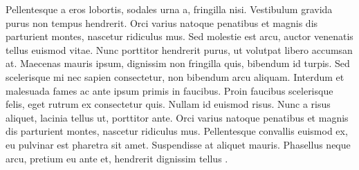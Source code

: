 Pellentesque a eros lobortis, sodales urna a, fringilla nisi. Vestibulum gravida purus non tempus hendrerit. Orci varius natoque penatibus et magnis dis parturient montes, nascetur ridiculus mus. Sed molestie est arcu, auctor venenatis tellus euismod vitae. Nunc porttitor hendrerit purus, ut volutpat libero accumsan at. Maecenas mauris ipsum, dignissim non fringilla quis, bibendum id turpis. Sed scelerisque mi nec sapien consectetur, non bibendum arcu aliquam. Interdum et malesuada fames ac ante ipsum primis in faucibus. Proin faucibus scelerisque felis, eget rutrum ex consectetur quis. Nullam id euismod risus. Nunc a risus aliquet, lacinia tellus ut, porttitor ante. Orci varius natoque penatibus et magnis dis parturient montes, nascetur ridiculus mus. Pellentesque convallis euismod ex, eu pulvinar est pharetra sit amet. Suspendisse at aliquet mauris. Phasellus neque arcu, pretium eu ante et, hendrerit dignissim tellus \cite{Smith2012}. 



